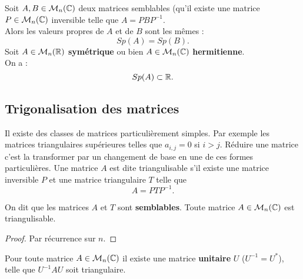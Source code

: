 \bp
Soit $A, B \in \mathcal{M}_n(\mathbb{C})$ deux matrices semblables (\ie qu'il existe une matrice $P \in \mathcal{M}_n(\mathbb{C})$ inversible telle que $A = PBP^{-1}$.\\
Alors les valeurs propres de $A$ et de $B$ sont les mêmes \ie:  $$Sp(A) = Sp(B).$$
\ep
\bp[Nature des valeurs propres d'une matrice hermitienne (\ie $A = A^*$)]
Soit $A \in \mathcal{M}_n(\mathbb{R})$ \textbf{symétrique} ou bien $A \in \mathcal{M}_n(\mathbb{C})$ \textbf{hermitienne}. \\
On a : $$Sp(A) \subset \mathbb{R}.$$
\ep
\subsection{Trigonalisation des matrices}
Il existe des classes de matrices particulièrement simples. Par exemple les matrices triangulaires supérieures \ie telles que $a_{i,j} = 0$ si $i>j$. Réduire une matrice c'est la transformer par un changement de base en une de ces formes particulières.
\medskip
\bd
Une matrice $A$ est dite triangulisable s'il existe une matrice inversible $P$ et une matrice triangulaire $T$ telle que $$A = PTP^{-1}.$$
\ed

\bn
On dit que les matrices $A$ et $T$ sont \textbf{semblables}.
\en
\medskip
\bp
Toute matrice $A \in \mathcal{M}_n(\mathbb{C})$ est triangulisable.
\ep
\begin{proof}
	Par récurrence sur $n$.
\end{proof}

Pour toute matrice $A \in \mathcal{M}_n(\mathbb{C})$ il existe une matrice \textbf{unitaire} $U$ (\ie $U^{-1} = U^*$), telle que $U^{-1}AU$ soit triangulaire.
\ep

